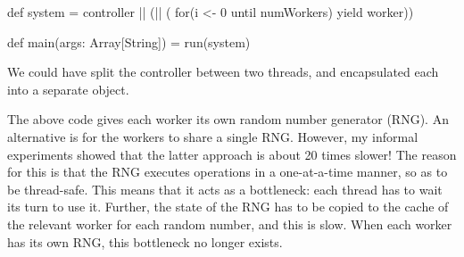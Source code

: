 \begin{answerS}
\begin{scala}
{  def system = controller || (|| ( for(i <- 0 until numWorkers) yield worker))

  def main(args: Array[String]) = run(system)
}
\end{scala}

We could have split the controller between two threads, and encapsulated each
into a separate object.

The above code gives each worker its own random number generator (RNG).  An
alternative is for the workers to share a single RNG\@.  However, my informal
experiments showed that the latter approach is about 20 times slower!  The
reason for this is that the RNG executes operations in a one-at-a-time manner,
so as to be thread-safe.  This means that it acts as a bottleneck: each thread
has to wait its turn to use it.  Further, the state of the RNG has to be
copied to the cache of the relevant worker for each random number, and this is
slow.  When each worker has its own RNG, this bottleneck no longer exists.
\end{answerS}



